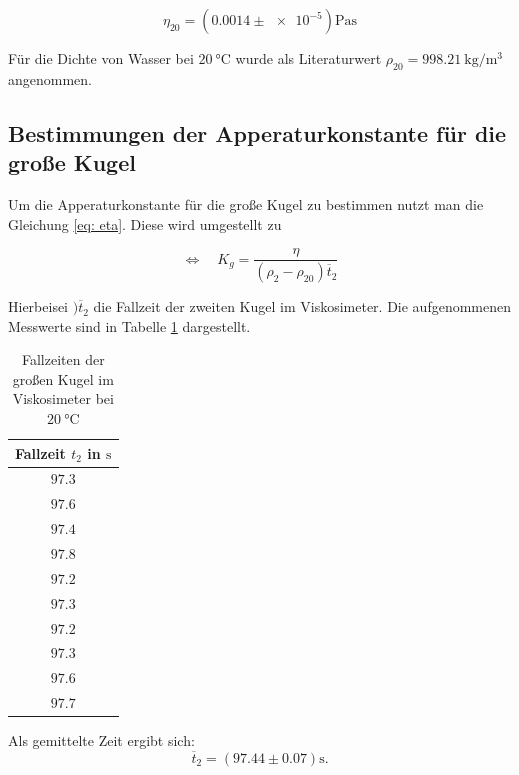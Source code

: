 \begin{equation}
\label{eq:viskosi_wasser}
\eta_{20}=\left(\num{0.0014}\pm\num{e-5}\right) \si{\pascal\second}
\end{equation}

Für die Dichte von Wasser bei $\SI{20}{\degreeCelsius}$ wurde als
Literaturwert $\rho_{20}=\SI{998.21}{\kilogram\per\cubic\meter}$ angenommen\cite{lit_dichte}. %

\subsection{Bestimmungen der Apperaturkonstante für die große Kugel}
Um die Apperaturkonstante für die große Kugel zu bestimmen nutzt man die 
Gleichung \eqref{eq: eta}. Diese wird umgestellt zu 

\begin{equation*}
\Leftrightarrow \quad K_{g}=\frac{\eta}{\left(\rho_2-\rho_{20}\right)\overline{t}_2}
\end{equation*}

Hierbeisei $)\overline{t}_2$ die Fallzeit der zweiten Kugel im Viskosimeter.
Die aufgenommenen Messwerte sind in Tabelle \ref{tab:messwerte_fallzeit_kugel_gross} dargestellt.

\begin{table}
\centering
\begin{tabular} {c}
  \toprule
  Fallzeit $t_2$ in $\si{\second}$ \\
  \midrule
  $\num{97.3}$ \\
  $\num{97.6}$ \\
  $\num{97.4}$ \\
  $\num{97.8}$ \\
  $\num{97.2}$ \\
  $\num{97.3}$ \\
  $\num{97.2}$ \\
  $\num{97.3}$ \\
  $\num{97.6}$ \\
  $\num{97.7}$ \\
\bottomrule
\end{tabular}
\caption{Fallzeiten der großen Kugel im Viskosimeter bei $\SI{20}{\degreeCelsius}$}
\label{tab:messwerte_fallzeit_kugel_gross}
\end{table}

Als gemittelte Zeit ergibt sich:
\begin{equation}
\label{eq:gemittelte_fallzeit_gross}
\overline{t}_{2}=\left(\num{97.44}\pm\num{0.07}\right) \si{\second}.
\end{equation}

